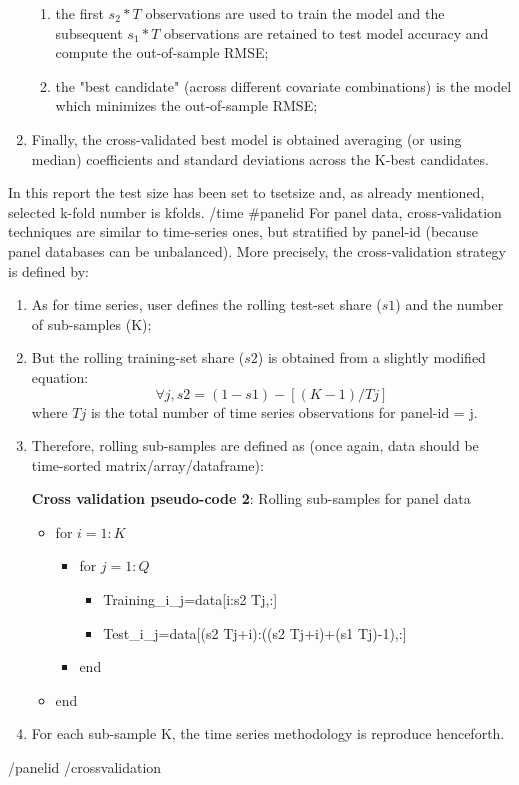 \documentclass{article}
\begin{document}
\begin{enumerate}
\begin{enumerate}
\item the first $s_{2}*T$ observations are used to train the model and the subsequent $s_{1}*T$ observations are retained to test model accuracy and compute the out-of-sample RMSE;
\item the "best candidate" (across different covariate combinations) is the model which minimizes the out-of-sample RMSE;
\end{enumerate}
\item Finally, the cross-validated best model is obtained averaging (or using median) coefficients and standard deviations across the K-best candidates.
\end{enumerate}

In this report the test size has been set to {{tsetsize}} and, as already mentioned,
selected k-fold number is {{kfolds}}.
{{/time}}
{{#panelid}}
For panel data, cross-validation techniques are similar to time-series ones, but stratified by panel-id (because panel databases can be unbalanced). More precisely, the cross-validation strategy is defined by:

\begin{enumerate}
\item As for time series, user defines the rolling test-set share ($s1$) and the number of sub-samples (K);
\item But the rolling training-set share ($s2$) is obtained from a slightly modified equation:
\begin{equation}
  \forall j, s2=(1-s1)-[(K-1)/T{j}] 
\end{equation}
where $T{j}$ is the total number of time series observations for panel-id = j.
\item Therefore, rolling sub-samples are defined as (once again, data should be time-sorted matrix/array/dataframe):

\begin{algorithm}
\caption*{\textbf{Cross validation pseudo-code 2}: Rolling sub-samples for panel data}
\begin{itemize}
    \item[] for $i=1:K$
    \begin{itemize}
        \item[]  for $j=1:Q$
        \begin{itemize}
            \item[] Training\_i\_j=data[i:s2 \times T{j},:]
            \item[] Test\_i\_j=data[(s2 \times T{j}+i):((s2 \times T{j}+i)+(s1 \times T{j})-1),:]
        \end{itemize}
        \item[] end
    \end{itemize}
    \item[] end
\end{itemize}     
\end{algorithm}

\item For each sub-sample K, the time series methodology is reproduce henceforth.
\end{enumerate}
{{/panelid}}
{{/crossvalidation}}
\end{document}
